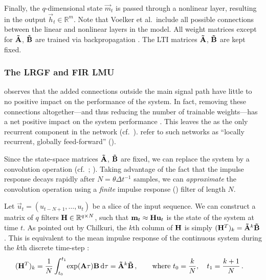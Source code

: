 Finally, the $q$-dimensional state $\vec m_t$ is passed through a nonlinear layer, resulting in the output $\vec{h}_t \in \mathbb{R}^m$.
Note that Voelker et al.~include all possible connections between the linear and nonlinear layers in the model.
All weight matrices except for $\mathbf{\tilde A}$, $\mathbf{\tilde B}$ are trained via backpropagation \citep[e.g.,][Section~5.3]{bishop2006pattern}.
The LTI matrices $\mathbf{\tilde A}$, $\mathbf{\tilde B}$ are kept fixed.

\subsubsection{The LRGF and FIR LMU}
 observes that the added connections outside the main signal path have little to no positive impact on the performance of the system.
In fact, removing these connections altogether---and thus reducing the number of trainable weights---has a net positive impact on the system performance \citep{chilkuri2021parallelizing}.
This leaves the \LDN as the only recurrent component in the network (cf.~).
 refer to such networks as \enquote{locally recurrent, globally feed-forward} (\LRGF).

Since the state-space matrices $\mathbf{\tilde A}$, $\mathbf{\tilde B}$ are fixed, we can replace the \LDN system by a convolution operation (cf.~; \cite{chilkuri2021parallelizing}).
Taking advantage of the fact that the \LDN impulse response decays rapidly after $N = \theta \Delta t^{-1}$ samples, we can \emph{approximate} the convolution operation using a \emph{finite} impulse response (\FIR) filter of length $N$.

Let $\vec u_t = (u_{t - N + 1}, \ldots, u_t)$ be a slice of the input sequence.
We can construct a matrix of $q$ \FIR filters $\mathbf{H} \in \mathbb{R}^{q \times N}$, such that $\mathbf{m}_t \approx \mathbf{H} \mathbf{u}_t$ is the state of the \LDN system at time $t$.
As pointed out by Chilkuri, the $k$th column of $\mathbf{H}$ is simply $(\mathbf{H}^T)_k = \mathbf{\tilde A}^k \mathbf{\tilde B}$.
This is equivalent to the mean impulse response of the continuous system during the $k$th discrete time-step \citep[cf.][]{stockel2021discrete}:
\begin{align}
	(\mathbf{H}^T)_k
		&= \frac{1}N \int_{t_0}^{t_1} \! \exp(\mathbf{A} \tau) \mathbf{B} \,\mathrm{d}\tau =  \mathbf{\tilde A}^k \mathbf{\tilde B} \,, \quad\quad \text{where } t_0 = \frac{k}{N}, \quad t_1 = \frac{k + 1}{N} \,.
	\label{eqn:ldn_h_matrix}
\end{align}

